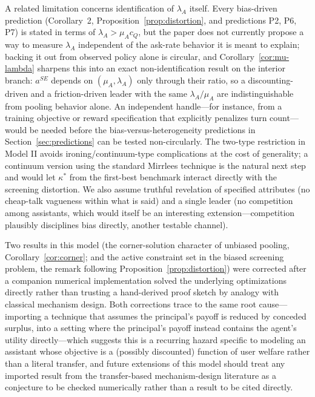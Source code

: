 \documentclass[11pt]{article}
\begin{document}
A related limitation concerns identification of $\lambda_A$ itself. Every
bias-driven prediction (Corollary~2, Proposition~\ref{prop:distortion}, and
predictions P2, P6, P7) is stated in terms of $\lambda_A>\mu_A c_Q$, but the paper
does not currently propose a way to measure $\lambda_A$ independent of the ask-rate
behavior it is meant to explain; backing it out from observed policy alone is
circular, and Corollary~\ref{cor:mu-lambda} sharpens this into an exact
non-identification result on the interior branch: $a^{SE}$ depends on
$(\mu_A,\lambda_A)$ only through their ratio, so a discounting-driven and a
friction-driven leader with the same $\lambda_A/\mu_A$ are indistinguishable from
pooling behavior alone. An independent handle---for instance, from a training
objective or reward specification that explicitly penalizes turn
count---would be needed before the bias-versus-heterogeneity predictions in
Section~\ref{sec:predictions} can be tested non-circularly. The two-type
restriction in Model II avoids
ironing/continuum-type complications at the cost of generality; a continuum
version using the standard Mirrlees technique is the natural next step and would
let $\kappa^*$ from the first-best benchmark interact directly with the screening
distortion. We also assume truthful revelation of specified attributes (no
cheap-talk vagueness within what is said) and a single leader (no competition
among assistants, which would itself be an interesting extension---competition
plausibly disciplines bias directly, another testable channel).

Two results in this model (the corner-solution character of unbiased pooling,
Corollary~\ref{cor:corner}; and the active constraint set in the biased
screening problem, the remark following Proposition~\ref{prop:distortion}) were
corrected after a companion numerical implementation solved the underlying
optimizations directly rather than trusting a hand-derived proof sketch by
analogy with classical mechanism design. Both corrections trace to the same
root cause---importing a technique that assumes the principal's payoff is
reduced by conceded surplus, into a setting where the principal's payoff
instead contains the agent's utility directly---which suggests this is a
recurring hazard specific to modeling an assistant whose objective is a
(possibly discounted) function of user welfare rather than a literal transfer,
and future extensions of this model should treat any imported result from the
transfer-based mechanism-design literature as a conjecture to be checked
numerically rather than a result to be cited directly.
\end{document}
